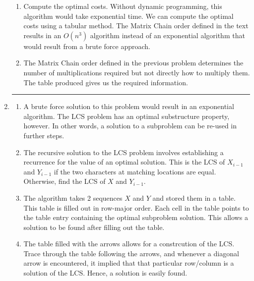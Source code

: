 \documentclass{article}
\begin{document}
\begin{enumerate}
\begin{enumerate}
        \item Compute the optimal costs. Without dynamic programming, this algorithm would take exponential time. We can compute the optimal costs using a tabular method. 
            The Matrix Chain order defined in the text results in an $O(n^3)$ algorithm instead of an exponential algorithm that would result from a brute force approach. 

        \item The Matrix Chain order defined in the previous problem determines the number of multiplications required but not directly how to multiply them.  The table produced gives us the required information. 
    \end{enumerate}
\noindent\rule{8cm}{0.4pt}


\item  
    
    \begin{enumerate}
        \item A brute force solution to this problem would result in an exponential algorithm. The LCS problem has an optimal substructure property, however. In other words, a solution to a subproblem can be re-used in further steps. 
            

        \item The recursive solution to the LCS problem involves establishing a recurrence for the value of an optimal solution. This is the LCS of $X_{i-1}$ and $Y_{i-1}$ if the two characters at matching locations are equal. Otherwise, find the LCS of $X$ and $Y_{i-1}$. 

        \item The algorithm takes 2 sequences $X$ and $Y$ and stored them in a table. This table is filled out in row-major order. Each cell in the table points to the table entry containing the optimal subproblem solution. This allows a solution to be found after filling out the table.
            

        \item  The table filled with the arrows allows for a constrcution of the LCS. Trace through the table following the arrows, and whenever a diagonal arrow is encountered, it implied that that particular row/column is a solution of the LCS. Hence, a solution is easily found. 
            
    \end{enumerate}


\end{enumerate}
\end{document}
